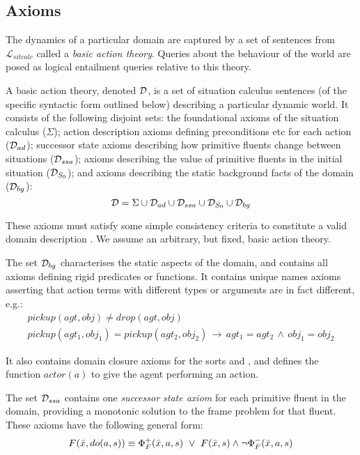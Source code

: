 \newpage{}


\subsection{Axioms\label{sec:Background:SC:Axioms}}

The dynamics of a particular domain are captured by a set of sentences
from $\mathcal{L}_{sitcalc}$ called a \emph{basic action theory}.
Queries about the behaviour of the world are posed as logical entailment
queries relative to this theory.

\begin{defnL}
 A basic action theory, denoted
$\mathcal{D}$, is a set of situation calculus sentences (of the specific
syntactic form outlined below) describing a particular dynamic world.
It consists of the following disjoint sets: the foundational axioms
of the situation calculus ($\Sigma$); action description axioms defining
preconditions etc for each action ($\mathcal{D}_{ad}$); successor state axioms
describing how primitive fluents change between situations ($\mathcal{D}_{ssa}$);
axioms describing the value of primitive fluents in the initial situation
($\mathcal{D}_{S_{0}}$); and axioms describing the static background facts
of the domain ($\mathcal{D}_{bg}$):\[
\mathcal{D}=\Sigma\cup\mathcal{D}_{ad}\cup\mathcal{D}_{ssa}\cup\mathcal{D}_{S_{0}}\cup\mathcal{D}_{bg}\]

\end{defnL}
These axioms must satisfy some simple consistency criteria to constitute
a valid domain description \citep{pirri99contributions_sitcalc}.
We assume an arbitrary, but fixed, basic action theory.

\medskip{}


The set $\mathcal{D}_{bg}$ characterises the static aspects of the domain,
and contains all axioms defining rigid predicates or functions. It
contains unique names axioms asserting that action terms with different
types or arguments are in fact different, e.g.:\begin{gather*}
pickup(agt,obj)\neq drop(agt,obj)\\
pickup(agt_{1},obj_{1})=pickup(agt_{2},obj_{2})\,\rightarrow\, agt_{1}=agt_{2}\,\wedge\, obj_{1}=obj_{2}\end{gather*}


It also contains domain closure axioms for the sorts  and , and defines the function $actor(a)$ to
give the agent performing an action.

\medskip{}


The set $\mathcal{D}_{ssa}$ contains one \emph{successor state axiom} for
each primitive fluent in the domain, providing a monotonic solution
to the frame problem for that fluent. These axioms have the following
general form: \[
F(\bar{x},do(a,s))\equiv\Phi_{F}^{+}(\bar{x},a,s)\,\,\vee\,\, F(\bar{x},s)\wedge\neg\Phi_{F}^{-}(\bar{x},a,s)\]



